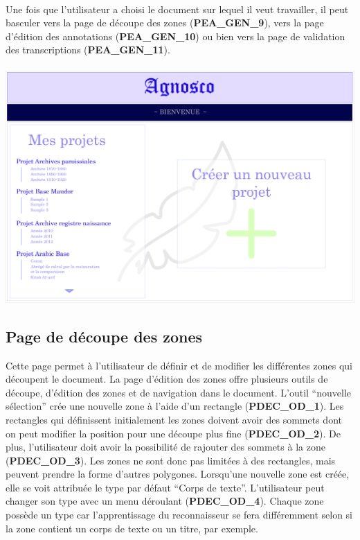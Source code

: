 \paragraph{}
Une fois que l’utilisateur a choisi le document sur lequel il veut travailler, il 
peut basculer vers la page de découpe des zones (\textbf{PEA\_GEN\_9}), vers
la page d’édition des annotations (\textbf{PEA\_GEN\_10}) ou bien vers la page
de validation des transcriptions (\textbf{PEA\_GEN\_11}).

\paragraph{}
\begin{mdframed}[frametitle={Figure 6 : Accueil de l'application}, innerbottommargin=10]
\begin{center}
\includegraphics[scale=0.045]{ihm1.jpg}
\end{center}
\end{mdframed}

\subsection{Page de découpe des zones}

Cette page permet à l’utilisateur de définir et de modifier les différentes
zones qui découpent le document. La page d’édition des zones offre
plusieurs outils de découpe, d’édition des zones et de navigation dans le
document. L’outil “nouvelle sélection” crée une nouvelle zone à l’aide d’un
rectangle (\textbf{PDEC\_OD\_1}). Les rectangles qui définissent initialement
les zones doivent avoir des sommets dont on peut modifier la position pour
une découpe plus fine (\textbf{PDEC\_OD\_2}). De plus, l’utilisateur doit avoir
la possibilité de rajouter des sommets à la zone (\textbf{PDEC\_OD\_3}). Les
zones ne sont donc pas limitées à des rectangles, mais peuvent prendre la forme
d’autres polygones. Lorsqu’une nouvelle zone est créée, elle se voit attribuée
le type par défaut “Corps de texte”. L’utilisateur peut changer son type avec
un menu déroulant (\textbf{PDEC\_OD\_4}). Chaque zone possède un type car
l’apprentissage du reconnaisseur se fera différemment selon si la zone contient
un corps de texte ou un titre, par exemple.

